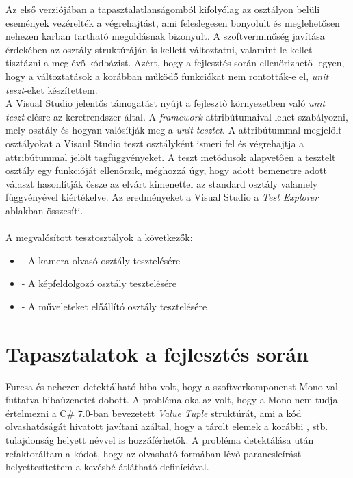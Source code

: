 Az  első verziójában a tapasztalatlanságomból kifolyólag az osztályon belüli események vezérelték a végrehajtást, ami feleslegesen bonyolult és meglehetősen nehezen karban tartható megoldásnak bizonyult. A szoftverminőség javítása érdekében az osztály struktúráján is kellett változtatni, valamint le kellet tisztázni a meglévő kódbázist. Azért, hogy a fejlesztés során ellenőrizhető legyen, hogy a változtatások a korábban működő funkciókat nem rontották-e el, \emph{unit teszt}-eket készítettem.\\
A Visual Studio jelentős támogatást nyújt a fejlesztő környezetben való \emph{unit teszt}-elésre az  keretrendszer által. A \emph{framework} attribútumaival lehet szabályozni, mely osztály és hogyan valósítják meg a \emph{unit tesztet}. A \code{[TestClass]} attribútummal megjelölt osztályokat a Visaul Studio teszt osztályként ismeri fel és végrehajtja a \code{[TestMethod]} attribútummal jelölt tagfüggvényeket. A teszt metódusok alapvetően a tesztelt osztály egy funkcióját ellenőrzik, méghozzá úgy, hogy adott bemenetre adott választ hasonlítják össze az elvárt kimenettel az  standard osztály valamely függvényével kiértékelve. Az eredményeket a Visual Studio a \emph{Test Explorer} ablakban összesíti.\\
\\
A megvalósított tesztosztályok a következők:
\begin{itemize}
\item {} - A kamera olvasó osztály tesztelésére
\item  {} - A képfeldolgozó osztály tesztelésére
\item  {} - A műveleteket előállító osztály tesztelésére
\end{itemize}


\section{Tapasztalatok a fejlesztés során}

Furcsa és nehezen detektálható hiba volt, hogy a szoftverkomponenst Mono-val futtatva  hibaüzenetet dobott. A probléma oka az volt, hogy a Mono nem tudja értelmezni a C\# 7.0-ban bevezetett \textit{Value Tuple} struktúrát, ami a kód olvashatóságát hivatott javítani azáltal, hogy a tárolt elemek a korábbi ,  stb. tulajdonság helyett névvel is hozzáférhetők. A probléma detektálása után refaktoráltam a kódot, hogy az olvasható  formában lévő parancsleírást helyettesítettem a kevésbé átlátható  definícióval. \\